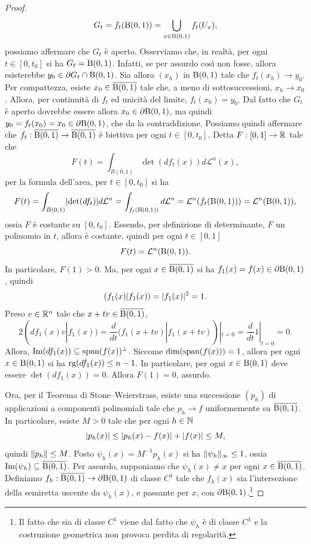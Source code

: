 \begin{proof}
	\[ G_t = f_t(\textup{B}(0,1)) = \bigcup_{x \in \textup{B}(0,1)} f_t(U_x),\]
	possiamo affermare che $G_t$ è aperto. Osserviamo che, in realtà, per ogni $t \in \left[ 0,t_0\right] $ si ha $G_t = \textup{B}(0,1)$. Infatti, se per assurdo così non fosse, allora esisterebbe $y_0 \in \partial G_t \cap \textup{B}(0,1)$. Sia allora $(x_h)$ in $\textup{B}(0,1)$ tale che $f_t(x_h) \to y_0$. Per compattezza, esiste $x_0 \in \overline{\textup{B}(0,1)}$ tale che, a meno di sottosuccessioni, $x_h \to x_0$. Allora, per continuità di $f_t$ ed unicità del limite, $f_t(x_0) = y_0$. Dal fatto che $G_t$ è aperto dovrebbe essere allora $x_0 \in \partial \textup{B}(0,1)$, ma quindi $y_ 0 = f_t(x_0) = x_0 \in \partial \textup{B}(0,1)$, che da la contraddizione. Possiamo quindi affermare che $f_t: \overline{\textup{B}(0,1)} \to \overline{\textup{B}(0,1)}$ è biettiva per ogni $t \in [0,t_0]$. Detta $F: [0,1] \to \mathbb{R}$ tale che
	\[ F(t) = \int_{B(0,1)} \det(df_t(x)) d\mathcal{L}^n(x), \]
	per la formula dell'area, per $t \in [0,t_0]$ si ha 
	\[ F(t) = \int_{B(0,1)} \lvert\det(df_t)\rvert d\mathcal{L}^n = \int_{f_t(\textup{B}(0,1))} d\mathcal{L}^n = \mathcal{L}^n(f_t(\textup{B}(0,1))) = \mathcal{L}^n(\textup{B}(0,1)),  \]
	ossia $F$ è costante su $[0,t_0]$. Essendo, per definizione di determinante, $F$ un polinomio in $t$, allora è costante, quindi per ogni $t \in [0,1]$
	\[ F(t) = \mathcal{L}^n(\textup{B}(0,1)). \]
	In particolare, $F(1)> 0$. Ma, per ogni $x \in \overline{\textup{B}(0,1)}$ si ha $f_1(x) = f(x) \in \partial \textup{B}(0,1)$, quindi 
	\[ (f_1(x) | f_1(x)) = \lvert f_1(x)\rvert^2=1. \]
	Preso $v \in \mathbb{R}^n$ tale che $x+tv \in \overline{\textup{B}(0,1)}$, 
	\[ 2(df_1(x)v | f_1(x)) = \frac{d}{dt} (f_1(x+tv) | f_1(x+tv))|_{t=0} = \frac{d}{dt} 1|_{t=0} = 0. \]
	Allora, $\textup{Im}(df_1(x)) \subseteq \textup{span}(f(x))^\perp$. Siccome $\dim (\textup{span}(f(x))) = 1$, allora per ogni $x \in \textup{B}(0,1)$ si ha $\textup{rg}(df_1(x)) \le n-1$. In particolare, per ogni $x \in \textup{B}(0,1)$ deve essere $\det(df_1(x)) = 0$. Allora $F(1) = 0$, assurdo.
	
	Ora, per il Teorema di Stone--Weierstrass, esiste una successione $(p_h)$ di applicazioni a componenti polinomiali tale che $p_h \to f$ uniformemente su $\overline{\textup{B}(0,1)}$. In particolare, esiste $M>0$ tale che per ogni $h \in \mathbb{N}$
	\[ \lvert p_h(x)\rvert \le \lvert p_h(x) - f(x)\rvert + \lvert f(x)\rvert \le M, \]
	quindi $\lVert p_h\rVert \le M$. Posto $\psi_h(x) = M^{-1} p_h(x)$ si ha $\lVert\psi_h\rVert_\infty \le 1$, ossia $\textup{Im}(\psi_h) \subseteq \overline{\textup{B}(0,1)}$. Per assurdo, supponiamo che $\psi_h(x) \ne x$ per ogni $x \in \overline{\textup{B}(0,1)}$. Definiamo $f_h: \overline{\textup{B}(0,1)} \to \partial \textup{B}(0,1)$ di classe $C^1$ tale che $f_h(x)$ sia l'intersezione della semiretta uscente da $\psi_h(x)$, e passante per $x$, con $\partial \textup{B}(0,1)$.\footnote{Il fatto che sia di classe $C^1$ viene dal fatto che $\psi_h$ è di classe $C^1$ e la costruzione geometrica non provoca perdita di regolarità.}
	

\end{proof}
